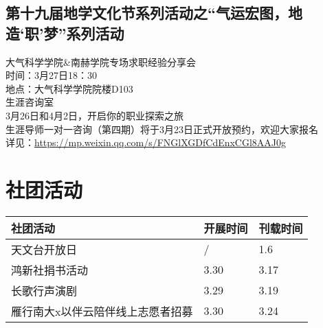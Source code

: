 \documentclass[letterpaper, 12pt]{article}
\begin{document}
\begin{multicols}{2}
\subsection{第十九届地学文化节系列活动之“气运宏图，地造‘职’梦”系列活动}
大气科学学院\&南赫学院专场求职经验分享会
\\时间：3月27日18：30
\\地点：大气科学学院院楼D103
\\生涯咨询室
\\3月26日和4月2日，开启你的职业探索之旅
\\生涯导师一对一咨询（第四期）将于3月23日正式开放预约，欢迎大家报名
\\详见：\url{https://mp.weixin.qq.com/s/FNGlXGDfCdEnxCGl8AAJ0g}
\section{社团活动}
\begin{tabular}{|>{\centering\arraybackslash}m{}|m{}|m{}|}
    \hline
    社团活动 & 开展时间 & 刊载时间\\
    \hline\hline
    天文台开放日 & / & 1.6\\
    鸿新社捐书活动 & 3.30 & 3.17\\
    长歌行声演剧 & 3.29 & 3.19\\
    雁行南大x以伴云陪伴线上志愿者招募 & 3.30 & 3.24\\
    \hline
\end{tabular}


\end{multicols}
\end{document}
